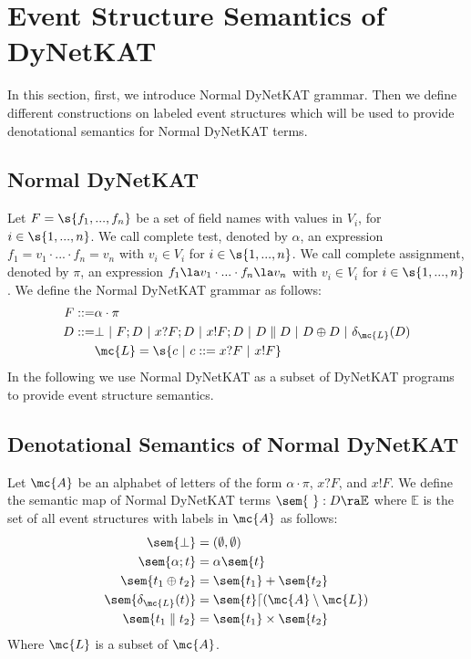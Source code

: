 \section{Event Structure Semantics of DyNetKAT}
In this section, first, we introduce Normal DyNetKAT grammar.
Then we define different constructions on labeled event structures
which will be used to provide denotational semantics for Normal
DyNetKAT terms.

\subsection{Normal DyNetKAT}

Let $F = \s{f_1,...,f_n}$ be a set of field names with 
values in $V_i$, for $i \in \s{1,...,n}$.
We call complete test, denoted by $\alpha$,
an expression $f_1 = v_1 \cdot ... \cdot f_n = v_n$ with $v_i \in V_i$ for $i \in \s{1,...,n}$.
We call complete assignment, denoted by $\pi$, an expression 
$f_1 \la v_1\cdot ... \cdot f_n \la v_n$ with $v_i \in V_i$ for 
$i \in \s{1,...,n}$.
We define the Normal DyNetKAT grammar as follows:
\begin{align*}
    F ::= & \alpha\cdot\pi                                                                           \\
    D ::= & \bot ~|~ F;D ~|~ x?F;D ~|~ x!F;D ~|~ D \parallel D ~|~ D \oplus D ~|~ \delta_{\mc{L}}(D) \\
          & \mc{L} = \s{c ~|~ c ::= x?F ~|~ x!F}
\end{align*}
In the following we use Normal DyNetKAT as a subset of DyNetKAT programs
to provide event structure semantics.

\subsection{Denotational Semantics of Normal DyNetKAT}

\begin{definition}
    Let $\mc{A}$ be an alphabet of letters of the form
    $\alpha \cdot \pi$,
    $x?F$, and $x!F$.
    We define the semantic map of Normal DyNetKAT terms
    $\sem{ \ }: D \ra \mathbb{E}$ where
    $\mathbb{E}$ is the set of all event structures with
    labels in $\mc{A}$ as follows:
    \begin{align*}
        \sem{\bot}      & = (\emptyset,\emptyset)                  \\
        \sem{\alpha; t} & = \alpha\sem{t}                        \\
        \sem{t_1 \oplus t_2}
                        & = \sem{t_1} + \sem{t_2}                  \\
        \sem{\delta_{\mc{L}}(t)}
                        & = \sem{t} \lceil (\mc{A} \setminus \mc{L}) \\
        \sem{t_1 \parallel t_2}
                        & = \sem{t_1} \times \sem{t_2}
    \end{align*}
    Where $\mc{L}$ is a subset of $\mc{A}$.
\end{definition}

